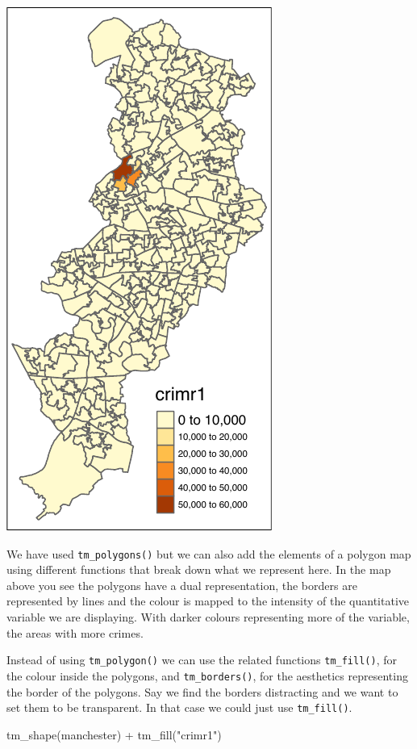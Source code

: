 \documentclass[
  krantz2]{krantz}
\makeatletter
\newenvironment{Shaded}{\begin{snugshade}}{\end{snugshade}}
\newcommand{\FunctionTok}[1]{\textcolor[rgb]{0,0,0}{#1}}
\newcommand{\NormalTok}[1]{#1}
\newcommand{\SpecialCharTok}[1]{\textcolor[rgb]{0,0,0}{#1}}
\newcommand{\StringTok}[1]{\textcolor[rgb]{0.5,0.5,0.5}{#1}}
\newenvironment{kframe}{%
\medskip{}
\setlength{\fboxsep}{.8em}
 \def\at@end@of@kframe{}%
 \ifinner\ifhmode%
  \def\at@end@of@kframe{\end{minipage}}%
  \begin{minipage}{\columnwidth}%
 \fi\fi%
 \def\FrameCommand##1{\hskip\@totalleftmargin \hskip-\fboxsep
 \colorbox{shadecolor}{##1}\hskip-\fboxsep
     \hskip-\linewidth \hskip-\@totalleftmargin \hskip\columnwidth}%
 \MakeFramed {\advance\hsize-\width
   \@totalleftmargin\z@ \linewidth\hsize
   \@setminipage}}%
 {\par\unskip\endMakeFramed%
 \at@end@of@kframe}
\renewenvironment{Shaded}{\begin{kframe}}{\end{kframe}}
\makeatother
\begin{document}
\includegraphics{crime_mapping_files/figure-latex/unnamed-chunk-84-1.pdf}

We have used \texttt{tm\_polygons()} but we can also add the elements of a polygon map using different functions that break down what we represent here. In the map above you see the polygons have a dual representation, the borders are represented by lines and the colour is mapped to the intensity of the quantitative variable we are displaying. With darker colours representing more of the variable, the areas with more crimes.

Instead of using \texttt{tm\_polygon()} we can use the related functions \texttt{tm\_fill()}, for the colour inside the polygons, and \texttt{tm\_borders()}, for the aesthetics representing the border of the polygons. Say we find the borders distracting and we want to set them to be transparent. In that case we could just use \texttt{tm\_fill()}.

\begin{Shaded}
\begin{Highlighting}[]
\FunctionTok{tm\_shape}\NormalTok{(manchester) }\SpecialCharTok{+} 
  \FunctionTok{tm\_fill}\NormalTok{(}\StringTok{"crimr1"}\NormalTok{)}
\end{Highlighting}
\end{Shaded}
\end{document}
